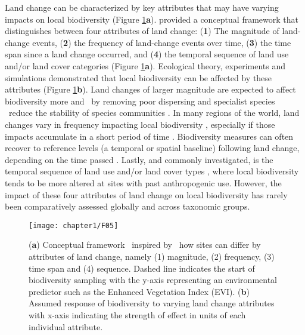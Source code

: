 Land change can be characterized by key attributes that may have varying impacts on local biodiversity (Figure \ref{F01_05}\textbf{a}). \cite{Watson2014} provided a conceptual framework that distinguishes between four attributes of land change: (\textbf{1}) The magnitude of land-change events, (\textbf{2}) the frequency of land-change events over time, (\textbf{3}) the time span since a land change occurred, and (\textbf{4}) the temporal sequence of land use and/or land cover categories (Figure \ref{F01_05}\textbf{a}). Ecological theory, experiments and simulations demonstrated that local biodiversity can be affected by these attributes (Figure \ref{F01_05}\textbf{b}). Land changes of larger magnitude are expected to affect biodiversity more \citep{Scheffer2001,Dornelas2010,Svensson2012,Ratajczak2018} and \textendash\ by removing poor dispersing \citep{Tilman1997} and specialist species \citep{Christensen2018} \textendash\ reduce the stability of species communities \citep{Scheffer2001,Hautier2015}. In many regions of the world, land changes vary in frequency \citep{Kleyer2007} impacting local biodiversity \citep{Valtonen2013,Lawson2015}, especially if those impacts accumulate in a short period of time \citep{Essl2015,Ratajczak2018}. Biodiversity measures can often recover to reference levels (\ie a temporal or spatial baseline) following land change, depending on the time passed \citep{Chazdon2003,Laurance2011,Martin2013}. Lastly, and commonly investigated, is the temporal sequence of land use and/or land cover types \citep{Harding1998,Chazdon2003,Foster2003}, where local biodiversity tends to be more altered at sites with past anthropogenic use. However, the impact of these four attributes of land change on local biodiversity has rarely been comparatively assessed globally and across taxonomic groups.

\begin{figure}[htb]
\centering
\texttt{[image: chapter1/F05]}
\caption{ (\textbf{a}) Conceptual framework \textendash\ inspired by \cite{Watson2014} \textendash\ how sites can differ by attributes of land change, namely (1) magnitude, (2) frequency, (3) time span and (4) sequence. Dashed line indicates the start of biodiversity sampling with the y-axis representing an environmental predictor such as the Enhanced Vegetation Index (EVI). (\textbf{b}) Assumed response of biodiversity to varying land change attributes with x-axis indicating the strength of effect in units of each individual attribute.  }
\label{F01_05}
\end{figure}

